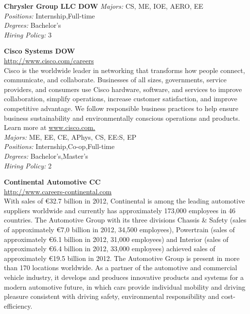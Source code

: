 \documentclass[twoside]{article}
\begin{document}
\begin{center}
\begin{multicols}{2}
\begin{minipage}{.95\columnwidth}{\Large\bf Chrysler Group LLC \hfill DOW}
    \emph{Majors:} CS, ME, IOE, AERO, EE\\
    \emph{Positions:} Internship,Full-time\\
    \emph{Degrees:} Bachelor's\\
    \emph{Hiring Policy:} 3\\
\end{minipage}
 \begin{minipage}{.95\columnwidth}{\Large\bf Cisco Systems \hfill DOW}\\
    \url{http://www.cisco.com/careers}\\
    Cisco is the worldwide leader in networking that transforms how people connect, communicate, and collaborate. Businesses of all sizes, governments, service providers, and consumers use Cisco hardware, software, and services to improve collaboration, simplify operations, increase customer satisfaction, and improve competitive advantage. We follow responsible business practices to help ensure business sustainability and environmentally conscious operations and products. Learn more at \url{www.cisco.com.}\\
    \emph{Majors:} ME, EE, CE, APhys, CS, EE:S, EP\\
    \emph{Positions:} Internship,Co-op,Full-time\\
    \emph{Degrees:} Bachelor's,Master's\\
    \emph{Hiring Policy:} 2\\
\end{minipage}
 \begin{minipage}{.95\columnwidth}{\Large\bf Continental Automotive \hfill CC}\\
    \url{http://www.careers-continental.com}\\
    With sales of €32.7 billion in 2012, Continental is among the leading automotive suppliers worldwide and currently has approximately 173,000 employees in 46 countries. The Automotive Group with its three divisions Chassis \& Safety (sales of approximately €7,0 billion in 2012, 34,500 employees), Powertrain (sales of approximately €6.1 billion in 2012, 31,000 employees) and Interior (sales of approximately €6.4 billion in 2012, 33,000 employees) achieved sales of approximately €19.5 billion in 2012. The Automotive Group is present in more than 170 locations worldwide. As a partner of the automotive and commercial vehicle industry, it develops and produces innovative products and systems for a modern automotive future, in which cars provide individual mobility and driving pleasure consistent with driving safety, environmental responsibility and cost-efficiency.\\

\end{minipage}
\end{multicols}
\end{center}
\end{document}

